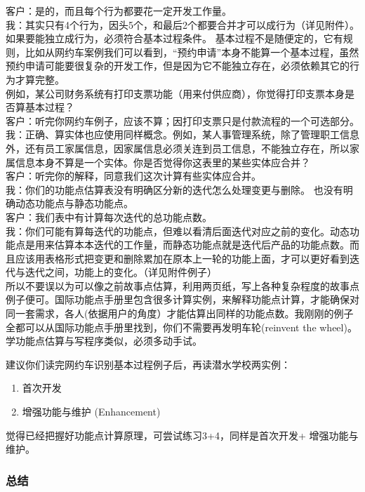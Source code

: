 客户：是的，而且每个行为都要花一定开发工作量。\\
我：其实只有4个行为，因头5个，和最后2个都要合并才可以成行为（详见附件）。
如果要能独立成行为，必须符合基本过程条件。
基本过程不是随便定的，它有规则，比如从网约车案例我们可以看到，``预约申请''本身不能算一个基本过程，虽然预约申请可能要很复杂的开发工作，但是因为它不能独立存在，必须依赖其它的行为才算完整。\\
例如，某公司财务系统有打印支票功能（用来付供应商），你觉得打印支票本身是否算基本过程？\\
客户：听完你网约车例子，应该不算；因打印支票只是付款流程的一个可选部分。\\
我：正确、算实体也应使用同样概念。例如，某人事管理系统，除了管理职工信息外，还有员工家属信息，因家属信息必须关连到员工信息，不能独立存在，所以家属信息本身不算是一个实体。你是否觉得你这表里的某些实体应合并？\\
客户：听完你的解释，同意我们这次计算有些实体应合并。\\
我：你们的功能点估算表没有明确区分新的迭代怎么处理变更与删除。
也没有明确动态功能点与静态功能点。\\
客户：我们表中有计算每次迭代的总功能点数。\\
我：你们可能有算每迭代的功能点，但难以看清后面迭代对应之前的变化。动态功能点是用来估算本本迭代的工作量，而静态功能点就是迭代后产品的功能点数。而且应该用表格形式把变更和删除累加在原本上一轮的功能上面，才可以更好看到迭代与迭代之间，功能上的变化。（详见附件例子）\\
所以不要误以为可以像之前故事点估算，利用两页纸，写上各种复杂程度的故事点例子便可。国际功能点手册里包含很多计算实例，来解释功能点计算，才能确保对同一套需求，各人(依据用户的角度）才能估算出同样的功能点数。我刚刚的例子全都可以从国际功能点手册里找到，你们不需要再发明车轮(reinvent
the wheel)。学功能点估算与写程序类似，必须多动手试。

建议你们读完网约车识别基本过程例子后，再读潜水学校两实例：

\begin{enumerate}
\tightlist
\item
  首次开发
\item
  增强功能与维护 (Enhancement)
\end{enumerate}

觉得已经把握好功能点计算原理，可尝试练习3+4，同样是首次开发+
增强功能与维护。

\hypertarget{ux603bux7ed3}{%
\subsubsection{总结}\label{ux603bux7ed3}}

